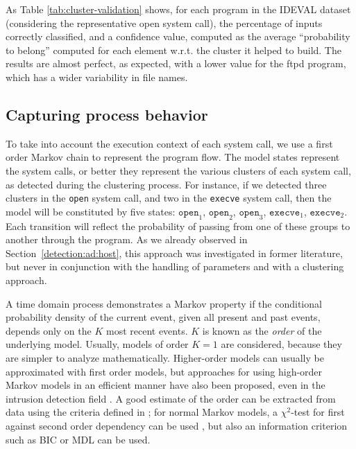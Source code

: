 As Table \ref{tab:cluster-validation} shows, for each program in the
\ac{IDEVAL} dataset (considering the representative open
system call), the percentage of inputs correctly classified, and a
confidence value, computed as the average ``probability to belong''
computed for each element w.r.t. the cluster it helped to build. The
results are almost perfect, as expected, with a lower value for the
ftpd program, which has a wider variability in file names.

\subsection{Capturing process behavior}
\label{host:syscall:markov}
To take into account the execution context of each system call, we use
a first order Markov chain to represent the program flow. The model
states represent the system calls, or better they represent the
various clusters of each system call, as detected during the
clustering process. For instance, if we detected three clusters in the
\texttt{open} system call, and two in the \texttt{execve} system call, then
the model will be constituted by five states: $\texttt{open}_1$,
$\texttt{open}_2$, $\texttt{open}_3$, $\texttt{execve}_1$,
$\texttt{execve}_2$. Each transition will reflect the probability of
passing from one of these groups to another through the program. As we
already observed in Section~\ref{detection:ad:host}, this approach was
investigated in former literature, but never in conjunction with the
handling of parameters and with a clustering approach.

A time domain process demonstrates a Markov property if the
conditional probability density of the current event, given all
present and past events, depends only on the $K$ most recent
events. $K$ is known as the \emph{order} of the underlying
model. Usually, models of order $K=1$ are considered, because they are
simpler to analyze mathematically. Higher-order models can usually be
approximated with first order models, but approaches for using
high-order Markov models in an efficient manner have also been
proposed, even in the intrusion detection field \citep{high}. A good
estimate of the order can be extracted from data using the criteria
defined in \citep{merhav}; for normal Markov models, a $\chi^2$-test
for first against second order dependency can be used
\citep{chiquadro}, but also an information criterion such as
\ac{BIC} or \ac{MDL} can be used.

